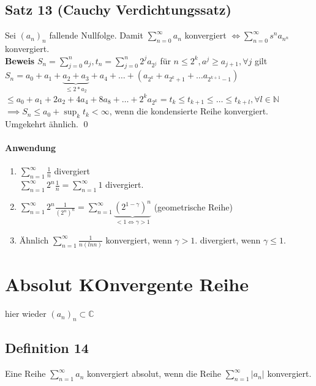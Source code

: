\documentclass[fleqn]{scrbook}
\renewenvironment{proof}{{\bfseries Beweis }}{\qed}
\begin{document}
\subsection{Satz 13 (Cauchy Verdichtungssatz)}
Sei $(a_n)_n$ fallende Nullfolge. Damit $\sum_{n=0}^\infty a_n$ konvergiert $\Leftrightarrow \sum_{n=0}^\infty s^n a_{n^n}$ konvergiert.\\
\begin{proof}
$S_n = \sum_{j=0}^n a_j, t_n = \sum_{j=0}^n 2^j a_{2^j}$ für $n \leq 2^k, a^j \geq a_{j+1}, \forall j$ gilt\\
$S_n = a_0 + a_1 + \underbrace{a_2 + a_3}_{\leq 2 * a_2} + a_4 + \ldots + (a_{2^k} + a_{2^k+1} + \ldots a_{2^{k+1}-1})$\\
$\leq a_0 + a_1 + 2a_2 + 4a_4 + 8a_8 + \ldots + 2^k a_{2^k} = t_k \leq t_{k+1} \leq \ldots \leq t_{k+l}, \forall l \in \mathbb{N}$\\
$\implies S_n \leq a_0  + \sup_k t_k < \infty$, wenn die kondensierte Reihe konvergiert.\\
Umgekehrt ähnlich.
\end{proof} 
\paragraph{Anwendung}
\begin{enumerate}[1)]
\item $\sum_{n=1}^\infty \frac{1}{n}$ divergiert\\
	$\sum_{n=1}^\infty 2^n \frac{1}{n} = \sum_{n=1}^\infty 1$ divergiert.
\item $\sum_{n=1}^\infty 2^n \frac{1}{(2^n)^n} = \sum_{n=1}^\infty	 \underbrace{(2^{1-\gamma})^n}_{<1 \Leftrightarrow \gamma > 1}$ (geometrische Reihe)
\item Ähnlich $\sum_{n=1}^\infty \frac{1}{n(ln n)}$ konvergiert, wenn $\gamma > 1$. divergiert, wenn $\gamma \leq 1$.
\end{enumerate}

\section{Absolut KOnvergente Reihe}
hier wieder $(a_n)_n \subset \mathbb{C}$

\subsection{Definition 14}
Eine Reihe $\sum_{n=1}^\infty a_n$ konvergiert absolut, wenn die Reihe $\sum_{n=1}^\infty |a_n|$ konvergiert.
\end{document}
